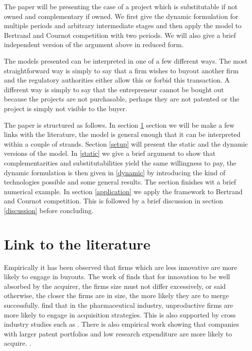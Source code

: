 \documentclass[11pt]{article}
\begin{document}
The paper will be presenting the case of a project which is substitutable if not owned and complementary if owned. We first give the dynamic formulation for multiple periods and arbitrary intermediate stages and then apply the model to Bertrand and Cournot competition with two periods. We will also give a brief independent version of the argument above in reduced form. 

The models presented can be interpreted in one of a few different ways. The most straightforward way is simply to say that a firm wishes to buyout another firm and the regulatory authorities either allow this or forbid this transaction. A different way is simply to say that the entrepreneur cannot be bought out because the projects are not purchasable, perhaps they are not patented or the project is simply not visible to the buyer. 







The paper is structured as follows. 
In section \ref{literature} section we will be make a few links with the literature, the model is general enough that it can be interpreted within a couple of strands. Section \ref{setup} will present the static and the dynamic versions of the model. In \ref{static} we give a brief argument to show that complementarities and substitutabilities yield the same willingness to pay, the dynamic formulation is then given in \ref{dynamic} by introducing the kind of technologies possible and some general results. The section finishes wit a brief numerical example. In section \ref{application} we apply the framework to Bertrand and Cournot competition. This is followed by a brief discussion in section \ref{discussion} before concluding. 

\section{Link to the literature}\label{literature}

Empirically it has been observed that firms which are less innovative are more likely to engage in buyouts. The work of \cite{Gerpott1995} finds that for innovation to be well absorbed by the acquirer, the firms size must not differ excessively, or said otherwise, the closer the firms are in size, the more likely they are to merge successfully. \cite{Higgins2006} find that in the pharmaceutical industry, unproductive firms are more likely to engage in acquisition strategies. This is also supported by cross industry studies such as \cite{Zhao2009}. There is also empirical work showing that companies with larger patent portfolios and low research expenditure are more likely to acquire. \cite{Bena2014}. 
\end{document}
